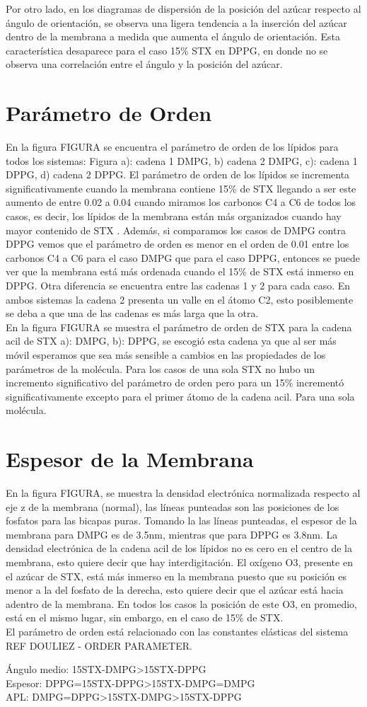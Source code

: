 Por otro lado, en los diagramas de dispersión de la posición del azúcar respecto al ángulo de orientación, se observa una ligera tendencia a la inserción del azúcar dentro de la membrana a medida que aumenta el ángulo de orientación. Esta característica desaparece para el caso 15\% STX en DPPG, en donde no se observa una correlación entre el ángulo y la posición del azúcar.\\
\section{Parámetro de Orden}
En la figura FIGURA se encuentra el parámetro de orden de los lípidos para todos los sistemas: Figura a): cadena 1 DMPG, b) cadena 2 DMPG, c): cadena 1 DPPG, d) cadena 2 DPPG. El parámetro de orden de los lípidos se incrementa significativamente  cuando la membrana contiene 15\% de STX llegando a ser este aumento de entre 0.02 a 0.04 cuando miramos los carbonos C4 a C6 de todos los casos, es decir, los lípidos de la membrana están más organizados cuando hay mayor contenido de STX . Además, si comparamos los casos de DMPG contra DPPG vemos que el parámetro de orden es menor en el orden de 0.01 entre los carbonos C4 a C6 para el caso DMPG que para el caso DPPG, entonces se puede ver que la membrana está más ordenada cuando el 15\% de STX está inmerso en DPPG. Otra diferencia se encuentra entre las cadenas 1 y 2 para cada caso. En ambos sistemas la cadena 2 presenta un valle en el átomo C2, esto posiblemente se deba a que una de las cadenas es más larga que la otra.\\

En la figura FIGURA se muestra el parámetro de orden de STX para la cadena acil de STX a): DMPG, b): DPPG, se escogió esta cadena ya que al ser más móvil esperamos que sea más sensible a cambios en las propiedades de los parámetros de la molécula. Para los casos de una sola STX no hubo un incremento significativo del parámetro de orden pero para un 15\% incrementó significativamente excepto para el primer átomo de la cadena acil. Para una sola molécula.
\section{Espesor de la Membrana}

En la figura FIGURA, se muestra la densidad electrónica normalizada respecto al eje z de la membrana (normal), las líneas punteadas son las posiciones de los fosfatos para las bicapas puras. Tomando la las líneas punteadas, el espesor de la membrana para DMPG es de 3.5nm, mientras que para DPPG es 3.8nm. La densidad electrónica de la cadena acil de los lípidos no es cero en el centro de la membrana, esto quiere decir que hay interdigitación. El oxígeno O3,  presente en el azúcar de STX, está más inmerso en la membrana puesto que su posición es menor a la del fosfato de la derecha, esto quiere decir que el azúcar está hacia adentro de la membrana. En todos los casos la posición de este O3, en promedio, está en el mismo lugar, sin embargo, en el caso de 15\% de STX. \\

El parámetro de orden está relacionado con las constantes elásticas del sistema REF DOULIEZ - ORDER PARAMETER.

\'{A}ngulo medio: 15STX-DMPG>15STX-DPPG \\
Espesor: DPPG=15STX-DPPG>15STX-DMPG=DMPG \\
APL: DMPG=DPPG>15STX-DMPG>15STX-DPPG \\
